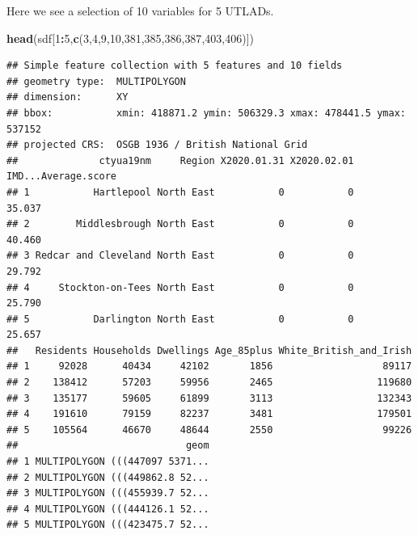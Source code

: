\documentclass[
]{book}
\newenvironment{Shaded}{\begin{snugshade}}{\end{snugshade}}
\newcommand{\DecValTok}[1]{\textcolor[rgb]{0.00,0.00,0.81}{#1}}
\newcommand{\KeywordTok}[1]{\textcolor[rgb]{0.13,0.29,0.53}{\textbf{#1}}}
\newcommand{\NormalTok}[1]{#1}
\newcommand{\OperatorTok}[1]{\textcolor[rgb]{0.81,0.36,0.00}{\textbf{#1}}}
\begin{document}
Here we see a selection of 10 variables for 5 UTLADs.

\begin{Shaded}
\begin{Highlighting}[]
\KeywordTok{head}\NormalTok{(sdf[}\DecValTok{1}\OperatorTok{:}\DecValTok{5}\NormalTok{,}\KeywordTok{c}\NormalTok{(}\DecValTok{3}\NormalTok{,}\DecValTok{4}\NormalTok{,}\DecValTok{9}\NormalTok{,}\DecValTok{10}\NormalTok{,}\DecValTok{381}\NormalTok{,}\DecValTok{385}\NormalTok{,}\DecValTok{386}\NormalTok{,}\DecValTok{387}\NormalTok{,}\DecValTok{403}\NormalTok{,}\DecValTok{406}\NormalTok{)])}
\end{Highlighting}
\end{Shaded}

\begin{verbatim}
## Simple feature collection with 5 features and 10 fields
## geometry type:  MULTIPOLYGON
## dimension:      XY
## bbox:           xmin: 418871.2 ymin: 506329.3 xmax: 478441.5 ymax: 537152
## projected CRS:  OSGB 1936 / British National Grid
##              ctyua19nm     Region X2020.01.31 X2020.02.01 IMD...Average.score
## 1           Hartlepool North East           0           0              35.037
## 2        Middlesbrough North East           0           0              40.460
## 3 Redcar and Cleveland North East           0           0              29.792
## 4     Stockton-on-Tees North East           0           0              25.790
## 5           Darlington North East           0           0              25.657
##   Residents Households Dwellings Age_85plus White_British_and_Irish
## 1     92028      40434     42102       1856                   89117
## 2    138412      57203     59956       2465                  119680
## 3    135177      59605     61899       3113                  132343
## 4    191610      79159     82237       3481                  179501
## 5    105564      46670     48644       2550                   99226
##                             geom
## 1 MULTIPOLYGON (((447097 5371...
## 2 MULTIPOLYGON (((449862.8 52...
## 3 MULTIPOLYGON (((455939.7 52...
## 4 MULTIPOLYGON (((444126.1 52...
## 5 MULTIPOLYGON (((423475.7 52...
\end{verbatim}
\end{document}
